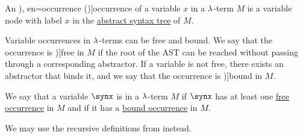 \begin{definition}\label{def:lambda_variable_occurrence}\mimprovised
  An \term[ru=вхождение (\cite[64]{Герасимов2011Вычислимость}), en=occurrence (\cite[9A2]{Hindley1997BasicSTT})]{occurrence} of a variable \( x \) in a \( {\mathrm \lambda} \)-term \( M \) is a variable node with label \( x \) in the \hyperref[def:lambda_term_ast]{abstract syntax tree} of \( M \).

  Variable occurrences in \( {\mathrm \lambda} \)-terms can be free and bound. We say that the occurrence is \term[ru=свободное (вхождение) (\cite[64]{Герасимов2011Вычислимость})]{free} in \( M \) if the root of the AST can be reached without passing through a corresponding abstractor. If a variable is not free, there exists an abstractor that binds it, and we say that the occurrence is \term[ru=связанное (вхождение) (\cite[64]{Герасимов2011Вычислимость})]{bound} in \( M \).
\end{definition}

\begin{definition}\label{def:lambda_variable_freeness}
  We say that a variable \( \synx \) is  in a \( {\mathrm \lambda} \)-term \( M \) if \( \synx \) has at least one \hyperref[def:lambda_variable_occurrence]{free occurrence} in \( M \) and  if it has a \hyperref[def:lambda_variable_occurrence]{bound occurrence} in \( M \).
\end{definition}
\begin{comments}
  \item We may use the recursive definitions from  instead.
\end{comments}

